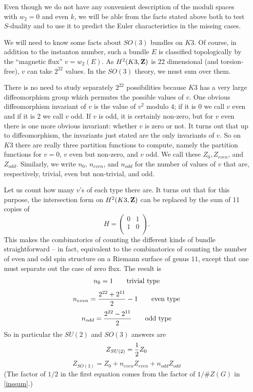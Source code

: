 \documentclass[12pt]{article}
\numberwithin{equation}{section}
\begin{document}
Even though we do not have any convenient description of
the moduli spaces with $w_2=0$ and even $k$, we will be able
from the facts stated above both to test
$S$-duality and to use it to predict
the Euler characteristics in the missing cases.

\bigskip
{}

We will need to know some facts about $SO(3)$ bundles on $K3$.
Of course, in addition to the instanton number, such a bundle $E$
is classified topologically by the ``magnetic flux'' $v=w_2(E)$.
As $H^2(K3,{\bf Z})$ is 22 dimensional (and torsion-free),
$v$ can take $2^{22}$ values.  In the $SO(3)$ theory, we must sum over them.

There is no need to study separately $2^{22}$ possibilities because
$K3$ has a very large diffeomorphism group which permutes the possible
values of $v$.  One obvious diffeomorphism invariant of $v$
is the value of $v^2$ modulo $4$; if it is 0 we call $v$ even and
if it is 2 we call $v$ odd.  If $v$ is odd, it is certainly non-zero,
but for $v$ even there is one more obvious invariant: whether $v$ is
zero or not.
It turns out that up to diffeomorphism, the invariants just stated
are the only invariants of $v$.
So on $K3$ there are really three partition functions to compute, namely
the partition functions for $v=0$, $v$ even but non-zero, and $v$ odd.
We call these
$Z_{0}, Z_{even}$, and $Z_{odd}$.  Similarly, we write $n_0$, $n_{even}$,
and $n_{odd}$ for the number of values of $v$ that are, respectively, trivial,
even but non-trivial, and odd.

Let us count how many $v$'s of each type there are.
It turns out that for this purpose,
the intersection form on $H^2(K3,{\bf Z})$
can be replaced by the sum of 11 copies of
\begin{equation}
  \label{humpo}
  H=
  \begin{pmatrix}0 & 1\\ 1 & 0 \\
  \end{pmatrix}.
\end{equation}
This makes the combinatorics of counting the different kinds
of bundle straightforward -- in fact,
equivalent to the combinatorics of counting
the number of even and odd spin structure on a Riemann surface
of genus $11$, except that one must separate out the case of zero flux.
The result is
%
$$n_0=1 \qquad {\rm trivial \ type}$$
$$n_{even}={2^{22}+2^{11}\over 2}-1\qquad {\rm even \ type}$$
$$n_{odd}={2^{22}-2^{11}\over 2}\qquad {\rm odd\ type}$$
%
So in particular the $SU(2)$ and $SO(3)$ answers are
%
$$Z_{SU(2)}={1\over 2}Z_0$$
$$Z_{SO(3)}=Z_{0}+n_{even}Z_{even}+n_{odd}Z_{odd}$$
%
(The factor of $1/2$ in the first equation comes from the factor
of $1/\# Z(G)$ in \eqref{inssum}.)
\end{document}
